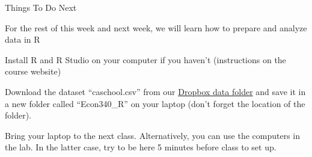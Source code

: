 \documentclass{./../div_teaching_slides}
\begin{document}
%


\begin{frame}{Things To Do Next}
\vspace{-0.5em}
\begin{witemize}
\item For the rest of this week and next week, we will learn how to prepare and analyze data in R
\item Install R and R Studio on your computer if you haven't (instructions on the course website)
\item Download the dataset ``caschool.csv'' from our \href{https://www.dropbox.com/sh/9x7ac4qwnddl650/AAAP1FdTpFp2rXyZ6t-9-qqTa?dl=0}{Dropbox data folder} and save it in a new folder called ``Econ340\_R'' on your laptop (don't forget the location of the folder).
\item Bring your laptop to the next class. Alternatively, you can use the computers in the lab. In the latter case, try to be here 5 minutes before class to set up.
\end{witemize}
\end{frame}
\end{document}
